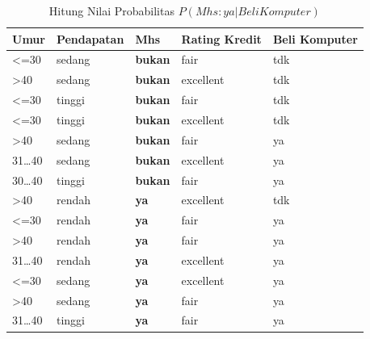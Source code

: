 \begin{enumerate}
\begin{table}[!ht]
\centering
\caption{Hitung Nilai Probabilitas $P(Mhs:ya|Beli Komputer)$ }
\label{prob2}
\begin{tabular}{|l|l|l|l|l|}
\hline
Umur             & Pendapatan & \textbf{Mhs}   & Rating Kredit & Beli Komputer \\ \hline
\textless{}=30   & sedang     & \textbf{bukan} & fair          & tdk           \\ \hline
\textgreater{}40 & sedang     & \textbf{bukan} & excellent     & tdk           \\ \hline
\textless{}=30   & tinggi     & \textbf{bukan} & fair          & tdk           \\ \hline
\textless{}=30   & tinggi     & \textbf{bukan} & excellent     & tdk           \\ \hline
\textgreater{}40 & sedang     & \textbf{bukan} & fair          & ya            \\ \hline
31…40            & sedang     & \textbf{bukan} & excellent     & ya            \\ \hline
30…40            & tinggi     & \textbf{bukan} & fair          & ya            \\ \hline
\textgreater{}40 & rendah     & \textbf{ya}    & excellent     & tdk           \\ \hline
\textless{}=30   & rendah     & \textbf{ya}    & fair          & ya            \\ \hline
\textgreater{}40 & rendah     & \textbf{ya}    & fair          & ya            \\ \hline
31…40            & rendah     & \textbf{ya}    & excellent     & ya            \\ \hline
\textless{}=30   & sedang     & \textbf{ya}    & excellent     & ya            \\ \hline
\textgreater{}40 & sedang     & \textbf{ya}    & fair          & ya            \\ \hline
31…40            & tinggi     & \textbf{ya}    & fair          & ya            \\ \hline
\end{tabular}
\end{table}




\end{enumerate}
